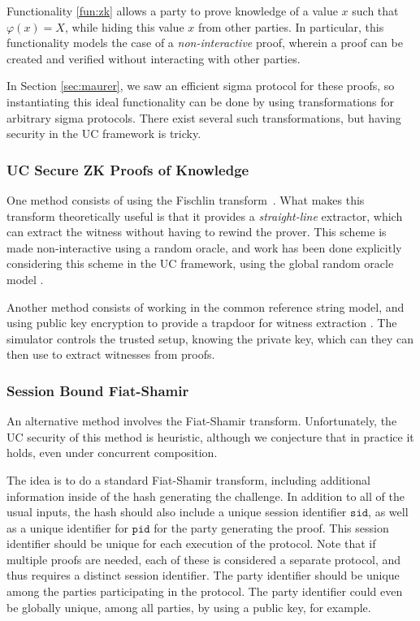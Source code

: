 Functionality \ref{fun:zk} allows a party to prove knowledge
of a value $x$ such that $\varphi(x) = X$, while hiding
this value $x$ from other parties.
In particular, this functionality models the case
of a \emph{non-interactive} proof, wherein a proof can
be created and verified without interacting with other parties.

In Section \ref{sec:maurer}, we saw an efficient sigma protocol
for these proofs, so instantiating this ideal functionality
can be done by using transformations for arbitrary sigma protocols.
There exist several such transformations, but having security
in the UC framework is tricky.

\subsubsection{UC Secure ZK Proofs of Knowledge}

One method consists of using the Fischlin transform~\cite{fischlin_communication-efficient_2005}.
What makes this transform theoretically useful is that it provides
a \emph{straight-line} extractor, which can extract the witness
without having to rewind the prover.
This scheme is made non-interactive using a random oracle,
and work has been done explicitly considering this scheme in the UC
framework, using the global random oracle model \cite{lysyanskaya_universally_2022}.

Another method consists of working in the common reference string
model, and using public key encryption to provide a trapdoor
for witness extraction \cite{krenn_framework_2011, kosba_cc_2015}.
The simulator controls the trusted setup, knowing the private key,
which can they can then use to extract witnesses from proofs.

\subsubsection{Session Bound Fiat-Shamir}

An alternative method involves the Fiat-Shamir \cite{fiat_how_2006} transform.
Unfortunately, the UC security of this method is heuristic,
although we conjecture that in practice it holds, even
under concurrent composition.

The idea is to do a standard Fiat-Shamir transform, including
additional information inside of the hash generating the challenge.
In addition to all of the usual inputs, the hash should also
include a unique session identifier $\texttt{sid}$, as well as a unique
identifier for $\texttt{pid}$ for the party generating the proof.
This session identifier should be unique for each execution of the protocol.
Note that if multiple proofs are needed, each of these is considered a separate protocol,
and thus requires a distinct session identifier.
The party identifier should be unique among the parties
participating in the protocol.
The party identifier could even be globally unique,
among all parties,
by using a public key, for example.

